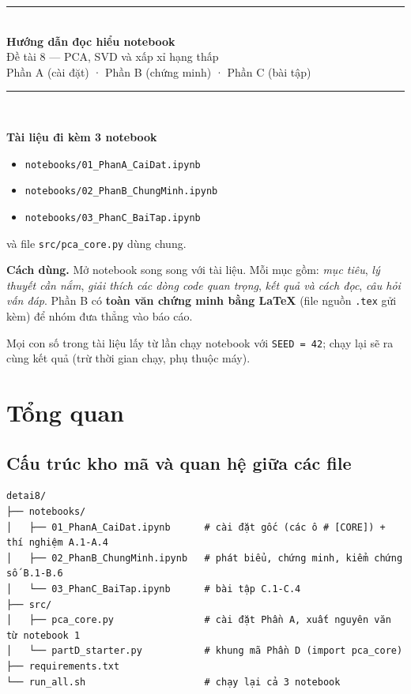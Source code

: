 \documentclass[11pt,a4paper]{article}
\newcommand{\code}[1]{\texttt{#1}}
\begin{document}
\renewcommand{\contentsname}{Mục lục}
\renewcommand{\figurename}{Hình}
\renewcommand{\tablename}{Bảng}

\begin{titlepage}
\centering
\vspace*{2.5cm}
{\color{accent}\rule{\linewidth}{1pt}}\\[0.6cm]
{\Huge\bfseries Hướng dẫn đọc hiểu notebook\\[0.3cm]}
{\LARGE Đề tài 8 — PCA, SVD và xấp xỉ hạng thấp\\[0.3cm]}
{\large Phần A (cài đặt) · Phần B (chứng minh) · Phần C (bài tập)}\\[0.4cm]
{\color{accent}\rule{\linewidth}{1pt}}\\[1.2cm]
\begin{minipage}{0.85\linewidth}
\small
\textbf{Tài liệu đi kèm 3 notebook}
\begin{itemize}
\item \code{notebooks/01\_PhanA\_CaiDat.ipynb}
\item \code{notebooks/02\_PhanB\_ChungMinh.ipynb}
\item \code{notebooks/03\_PhanC\_BaiTap.ipynb}
\end{itemize}
và file \code{src/pca\_core.py} dùng chung.

\textbf{Cách dùng.} Mở notebook song song với tài liệu. Mỗi mục gồm: \emph{mục tiêu}, \emph{lý thuyết cần nắm}, \emph{giải thích các dòng code quan trọng}, \emph{kết quả và cách đọc}, \emph{câu hỏi vấn đáp}. Phần B có \textbf{toàn văn chứng minh bằng LaTeX} (file nguồn \code{.tex} gửi kèm) để nhóm đưa thẳng vào báo cáo.

Mọi con số trong tài liệu lấy từ lần chạy notebook với \code{SEED = 42}; chạy lại sẽ ra cùng kết quả (trừ thời gian chạy, phụ thuộc máy).
\end{minipage}
\vfill
\end{titlepage}

\tableofcontents
\newpage

\section{Tổng quan}
\subsection{Cấu trúc kho mã và quan hệ giữa các file}
\begin{verbatim}
detai8/
├── notebooks/
│   ├── 01_PhanA_CaiDat.ipynb      # cài đặt gốc (các ô # [CORE]) + thí nghiệm A.1-A.4
│   ├── 02_PhanB_ChungMinh.ipynb   # phát biểu, chứng minh, kiểm chứng số B.1-B.6
│   └── 03_PhanC_BaiTap.ipynb      # bài tập C.1-C.4
├── src/
│   ├── pca_core.py                # cài đặt Phần A, xuất nguyên văn từ notebook 1
│   └── partD_starter.py           # khung mã Phần D (import pca_core)
├── requirements.txt
└── run_all.sh                     # chạy lại cả 3 notebook
\end{verbatim}
\end{document}
